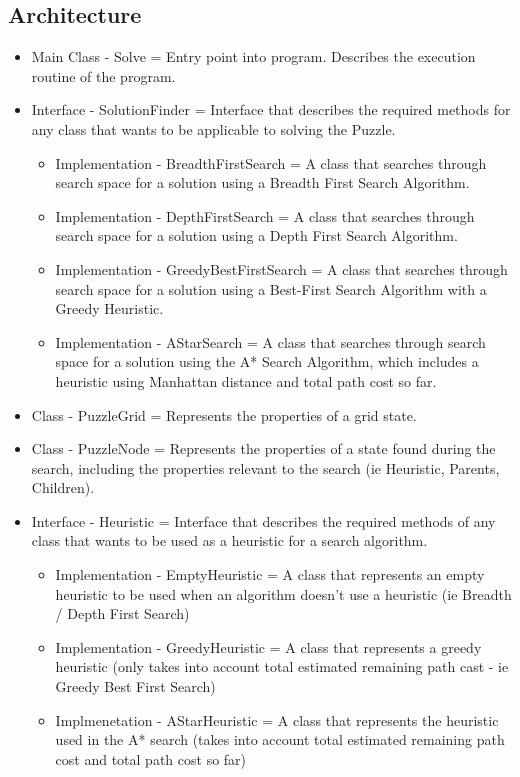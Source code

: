\documentclass[12pt]{article}
\begin{document}
\subsection{Architecture}
\begin{itemize}
	\item Main Class - Solve = Entry point into program. Describes the execution routine of the program.
	\item Interface - SolutionFinder = Interface that describes the required methods for any class that wants to be applicable to solving the Puzzle. 
	\begin{itemize}
		\item Implementation - BreadthFirstSearch = A class that searches through search space for a solution using a Breadth First Search Algorithm.
		\item Implementation - DepthFirstSearch = A class that searches through search space for a solution using a Depth First Search Algorithm.
		\item Implementation - GreedyBestFirstSearch = A class that searches through search space for a solution using a Best-First Search Algorithm with a Greedy Heuristic.
		\item Implementation - AStarSearch = A class that searches through search space for a solution using the A* Search Algorithm, which includes a heuristic using Manhattan distance and total path cost so far.
	\end{itemize}
	\item Class - PuzzleGrid = Represents the properties of a grid state.
	\item Class - PuzzleNode = Represents the properties of a state found during the search, including the properties relevant to the search (ie Heuristic, Parents, Children).
	\item Interface - Heuristic = Interface that describes the required methods of any class that wants to be used as a heuristic for a search algorithm.
	\begin{itemize}
		\item Implementation - EmptyHeuristic = A class that represents an empty heuristic to be used when an algorithm doesn't use a heuristic (ie Breadth / Depth First Search)
		\item Implementation - GreedyHeuristic = A class that represents a greedy heuristic (only takes into account total estimated remaining path cast - ie Greedy Best First Search)
		\item Implmenetation - AStarHeuristic = A class that represents the heuristic used in the A* search (takes into account total estimated remaining path cost and total path cost so far)
	\end{itemize}
\end{itemize}
\end{document}
